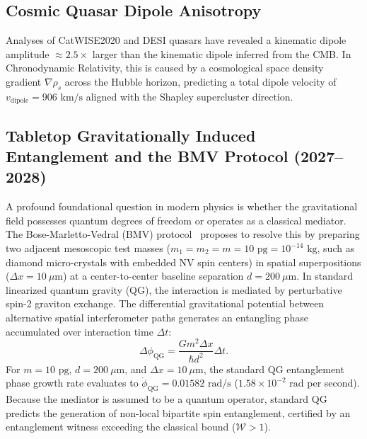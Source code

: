 \documentclass[aps,prd,reprint,superscriptaddress,nofootinbib,twocolumn,floatfix]{revtex4-2}
\begin{document}
\subsection{Cosmic Quasar Dipole Anisotropy}
\label{sec:dipole}
Analyses of CatWISE2020 and DESI quasars have revealed a kinematic dipole amplitude $\approx 2.5\times$ larger than the kinematic dipole inferred from the CMB. In Chronodynamic Relativity, this is caused by a cosmological space density gradient $\nabla\rho_s$ across the Hubble horizon, predicting a total dipole velocity of $v_{\text{dipole}} = 906\text{ km/s}$ aligned with the Shapley supercluster direction.

\subsection{Tabletop Gravitationally Induced Entanglement and the BMV Protocol (2027--2028)}
\label{sec:quantum}

A profound foundational question in modern physics is whether the gravitational field possesses quantum degrees of freedom or operates as a classical mediator. The Bose-Marletto-Vedral (BMV) protocol~\cite{bose2017spin,marletto2017gravitationally} proposes to resolve this by preparing two adjacent mesoscopic test masses ($m_1 = m_2 = m = 10\text{ pg} = 10^{-14}\text{ kg}$, such as diamond micro-crystals with embedded NV spin centers) in spatial superpositions ($\Delta x = 10\ \mu\text{m}$) at a center-to-center baseline separation $d = 200\ \mu\text{m}$. In standard linearized quantum gravity (QG), the interaction is mediated by perturbative spin-2 graviton exchange. The differential gravitational potential between alternative spatial interferometer paths generates an entangling phase accumulated over interaction time $\Delta t$:
\begin{equation}
\Delta\phi_{\text{QG}} = \frac{G m^2 \Delta x}{\hbar d^2} \Delta t.
\label{eq:qg_entanglement_phase}
\end{equation}
For $m = 10\text{ pg}$, $d = 200\ \mu\text{m}$, and $\Delta x = 10\ \mu\text{m}$, the standard QG entanglement phase growth rate evaluates to $\dot{\phi}_{\text{QG}} = 0.01582\text{ rad/s}$ ($1.58\times 10^{-2}\text{ rad}$ per second). Because the mediator is assumed to be a quantum operator, standard QG predicts the generation of non-local bipartite spin entanglement, certified by an entanglement witness exceeding the classical bound ($\mathcal{W} > 1$).
\end{document}
